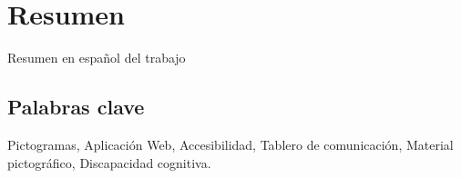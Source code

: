\chapter*{Resumen}

Resumen en español del trabajo


\section*{Palabras clave}
   
\noindent Pictogramas, Aplicación Web, Accesibilidad, Tablero de comunicación, Material pictográfico, Discapacidad cognitiva. 

   


